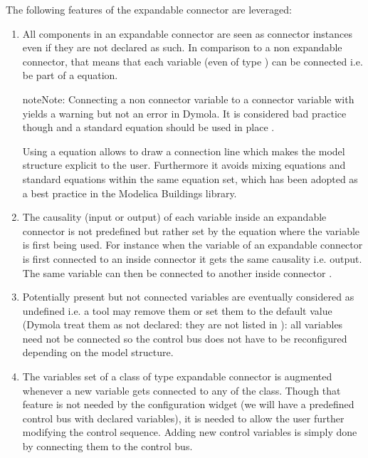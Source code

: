 \documentclass[letterpaper,10pt, openany,english]{sphinxmanual}
\begin{document}
The following features of the expandable connector are leveraged:
\begin{enumerate}
%
\item {} 
All components in an expandable connector are seen as connector instances even if they are not declared as such. In comparison to a non expandable connector, that means that each variable (even of type ) can be connected i.e. be part of a  equation.

\begin{sphinxadmonition}{note}{Note:}
Connecting a non connector variable to a connector variable with  yields a warning but not an error in Dymola. It is considered bad practice though and a standard equation should be used in place .

Using a  equation allows to draw a connection line which makes the model structure explicit to the user. Furthermore it avoids mixing  equations and standard equations within the same equation set, which has been adopted as a best practice in the Modelica Buildings library.
\end{sphinxadmonition}

\item {} 
The causality (input or output) of each variable inside an expandable connector is not predefined but rather set by the  equation where the variable is first being used. For instance when the variable of an expandable connector is first connected to an inside connector  it gets the same causality i.e. output. The same variable can then be connected to another inside connector  .

\item {} 
Potentially present but not connected variables are eventually considered as undefined i.e. a tool may remove them or set them to the default value (Dymola treat them as not declared: they are not listed in ): all variables need not be connected so the control bus does not have to be reconfigured depending on the model structure.

\item {} 
The variables set of a class of type expandable connector is augmented whenever a new variable gets connected to any  of the class. Though that feature is not needed by the configuration widget (we will have a predefined control bus with declared variables), it is needed to allow the user further modifying the control sequence. Adding new control variables is simply done by connecting them to the control bus.

\end{enumerate}
\end{document}
